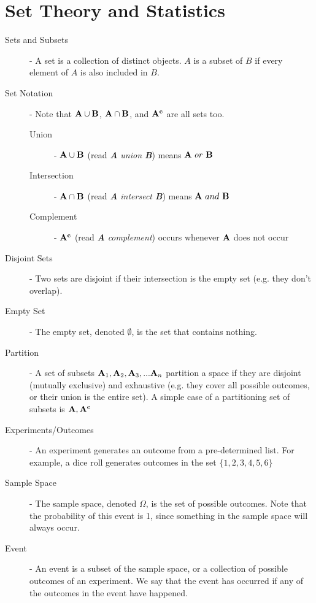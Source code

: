\documentclass[11pt]{article}
\begin{document}
\section*{Set Theory and Statistics}

\begin{description}
  \item[Sets and Subsets] - A set is a collection of distinct objects. $A$ is a subset of $B$ if every element of $A$ is also included in $B$. %
  \item[Set Notation] - Note that ${\bf {\bf A}} \cup {\bf B}$, ${\bf A} \cap {\bf B}$, and ${\bf A^c}$ are all sets too.
  \begin{description}
    \item[Union] - ${\bf A} \cup {\bf B}$ (read \emph{{\bf A} union {\bf B}}) means ${\bf A}\ or\ {\bf B}$
    \item[Intersection] - ${\bf A} \cap {\bf B}$ (read \emph{{\bf A} intersect {\bf B}}) means ${\bf A}\ and \ {\bf B}$
    \item[Complement] - ${\bf A^c}$ (read \emph{{\bf A} complement}) occurs whenever ${\bf A}$ does not occur
  \end{description}
  \item[Disjoint Sets] - Two sets are disjoint if their intersection is the empty set (e.g. they don't overlap).
  \item[Empty Set] - The empty set, denoted $\emptyset$, is the set that contains nothing.
  \item[Partition] - A set of subsets ${\bf A}_1, {\bf A}_2, {\bf A}_3, ... {\bf A}_n$ partition a space if they are disjoint (mutually exclusive) and exhaustive (e.g. they cover all possible outcomes, or their union is the entire set). A simple case of a partitioning set of subsets is ${\bf A}, {\bf A^c}$
  \item[Experiments/Outcomes] - An experiment generates an outcome from a pre-determined list. For example, a dice roll generates outcomes in the set $\{1, 2, 3, 4, 5, 6\}$
  \item[Sample Space] - The sample space, denoted $\Omega$, is the set of possible outcomes. Note that the probability of this event is 1, since something in the sample space will always occur.
  \item[Event] - An event is a subset of the sample space, or a collection of possible outcomes of an experiment. We say that the event has occurred if any of the outcomes in the event have happened.
\end{description}
\end{document}
